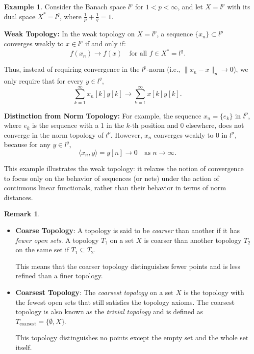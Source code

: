 \documentclass[12pt, reqno]{amsart}
\theoremstyle{definition}
\newtheorem{example}[theorem]{Example}
\newtheorem{remark}[theorem]{Remark}
\numberwithin{equation}{section}
\begin{document}
\begin{example}
Consider the Banach space \( l^p \) for \( 1 < p < \infty \), and let \( X = l^p \) with its dual space \( X^* = l^q \), where \( \frac{1}{p} + \frac{1}{q} = 1 \).

\textbf{Weak Topology:} In the weak topology on \( X = l^p \), a sequence \( \{x_n\} \subset l^p \) converges weakly to \( x \in l^p \) if and only if:
\[
f(x_n) \to f(x) \quad \text{for all } f \in X^* = l^q.
\]

Thus, instead of requiring convergence in the \( l^p \)-norm (i.e., \( \|x_n - x\|_p \to 0 \)), we only require that for every \( y \in l^q \),
\[
\sum_{k=1}^\infty x_n[k] y[k] \to \sum_{k=1}^\infty x[k] y[k].
\]

\textbf{Distinction from Norm Topology:} For example, the sequence \( x_n = \{e_k\} \) in \( l^p \), where \( e_k \) is the sequence with a 1 in the \( k \)-th position and 0 elsewhere, does not converge in the norm topology of \( l^p \). However, \( x_n \) converges weakly to 0 in \( l^p \), because for any \( y \in l^q \),
\[
\langle x_n, y \rangle = y[n] \to 0 \quad \text{as } n \to \infty.
\]

\end{example}

This example illustrates the weak topology: it relaxes the notion of convergence to focus only on the behavior of sequences (or nets) under the action of continuous linear functionals, rather than their behavior in terms of norm distances.
\pagebreak

\begin{remark} \hfill
\begin{itemize}
    \item \textbf{Coarse Topology}: A topology is said to be \textit{coarser} than another if it has \textit{fewer open sets}. A topology $T_1$ on a set $X$ is coarser than another topology $T_2$ on the same set if $T_1 \subseteq T_2$. 
    
    This means that the coarser topology distinguishes fewer points and is less refined than a finer topology.

    \item \textbf{Coarsest Topology}: The \textit{coarsest topology} on a set $X$ is the topology with the fewest open sets that still satisfies the topology axioms. The coarsest topology is also known as the \textit{trivial topology} and is defined as $T_{\text{coarsest}} = \{\emptyset, X\}$. 
    
    This topology distinguishes no points except the empty set and the whole set itself.
\end{itemize}

\end{remark}
\end{document}
